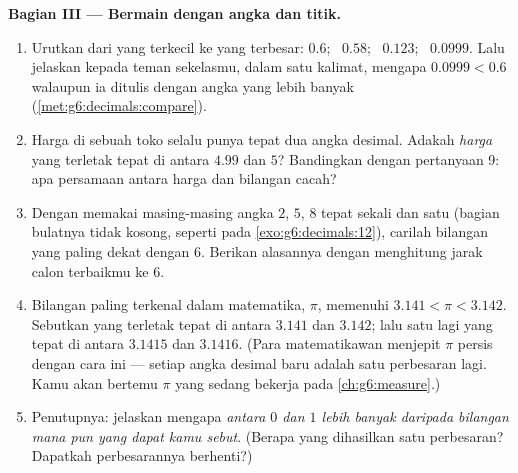 \begin{problem}
\medskip
\noindent\textbf{Bagian III --- Bermain dengan angka dan titik.}
\begin{enumerate}[resume]
  \item Urutkan dari yang terkecil ke yang terbesar: $0.6$; \ $0.58$;
        \ $0.123$; \ $0.0999$. Lalu jelaskan kepada teman sekelasmu,
        dalam satu kalimat, mengapa $0.0999 < 0.6$ walaupun ia
        ditulis dengan angka yang lebih banyak
        (\cref{met:g6:decimals:compare}).
  \item Harga di sebuah toko selalu punya tepat dua angka desimal.
        Adakah \emph{harga} yang terletak tepat di antara $4.99$ dan
        $5$? Bandingkan dengan pertanyaan 9: apa persamaan antara
        harga dan bilangan cacah?
  \item Dengan memakai masing-masing angka $2$, $5$, $8$ tepat
        sekali dan satu  (bagian bulatnya tidak kosong,
        seperti pada \cref{exo:g6:decimals:12}), carilah bilangan
        yang paling dekat dengan $6$. Berikan alasannya dengan
        menghitung jarak calon terbaikmu ke $6$.
  \item Bilangan paling terkenal dalam matematika, $\pi$, memenuhi
        $3.141 < \pi < 3.142$. Sebutkan  yang
        terletak tepat di antara $3.141$ dan $3.142$; lalu satu lagi
        yang tepat di antara $3.1415$ dan $3.1416$. (Para
        matematikawan menjepit $\pi$ persis dengan cara ini ---
        setiap angka desimal baru adalah satu perbesaran lagi. Kamu
        akan bertemu $\pi$ yang sedang bekerja pada
        \cref{ch:g6:measure}.)
  \item Penutupnya: jelaskan mengapa \emph{ antara
        $0$ dan $1$ lebih banyak daripada bilangan mana pun yang
        dapat kamu sebut}. (Berapa yang dihasilkan satu perbesaran?
        Dapatkah perbesarannya berhenti?)

\end{enumerate}
\end{problem}
